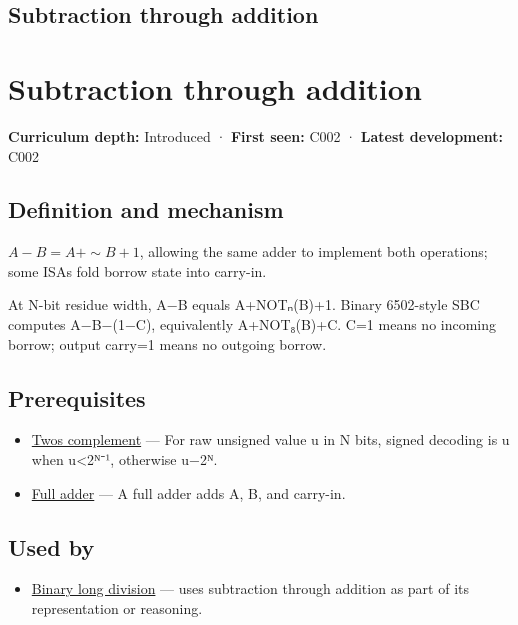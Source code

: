 \hypertarget{appendix-1c7df340573e}{}
\section*{Subtraction through addition}
\chapter{Subtraction through addition}\label{appendix-1c7df340573e-subtraction-through-addition}

\textbf{Curriculum depth:} Introduced · \textbf{First seen:} C002 · \textbf{Latest development:} C002

\section{Definition and mechanism}\label{appendix-1c7df340573e-definition-and-mechanism}

\(A-B=A+\sim B+1\), allowing the same adder to implement both operations; some ISAs fold borrow state into carry-in.

At N-bit residue width, A−B equals A+NOTₙ(B)+1. Binary 6502-style SBC computes A−B−(1−C), equivalently A+NOT₈(B)+C. C=1 means no incoming borrow; output carry=1 means no outgoing borrow.

\section{Prerequisites}\label{appendix-1c7df340573e-prerequisites}

\begin{itemize}
\tightlist
\item
  \hyperref[appendix-4fbc03d20829]{Two\textquotesingle s complement} --- For raw unsigned value u in N bits, signed decoding is u when u\textless2ᴺ⁻¹, otherwise u−2ᴺ.
\item
  \hyperref[appendix-d1a5b1e520c2]{Full adder} --- A full adder adds A, B, and carry-in.
\end{itemize}

\section{Used by}\label{appendix-1c7df340573e-used-by}

\begin{itemize}
\tightlist
\item
  \hyperref[appendix-89985e6a2685]{Binary long division} --- uses subtraction through addition as part of its representation or reasoning.
\end{itemize}

